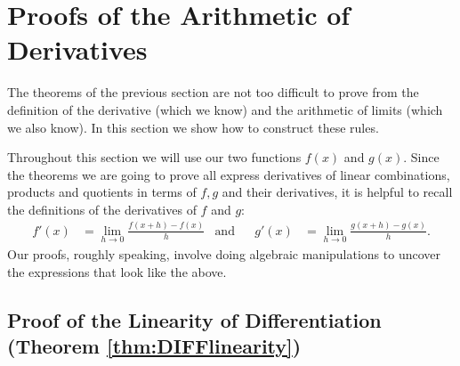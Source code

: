 \section{Proofs of the Arithmetic of Derivatives}\label{sec proof arith deriv}

The theorems of the previous section are not too difficult to prove from the
definition of the derivative (which we know) and the arithmetic of
limits (which we also know). In this section we show how to construct
these rules.

Throughout this section we will use our two functions $f(x)$ and $g(x)$. Since the
theorems we are going to prove all express derivatives of linear combinations, products
and quotients in terms of $f,g$ and their derivatives, it is helpful to recall the
definitions of the derivatives of $f$ and $g$:
\begin{align*}
f'(x) &=\lim_{h\to0} \frac{f(x+h)-f(x)}{h} &\text{and}&&
g'(x) &=\lim_{h\to0} \frac{g(x+h)-g(x)}{h}.
\end{align*}
Our proofs, roughly speaking, involve doing algebraic manipulations to uncover the
expressions that look like the above.



\subsection*{Proof of the Linearity of Differentiation
                (Theorem \ref{thm:DIFFlinearity})}

